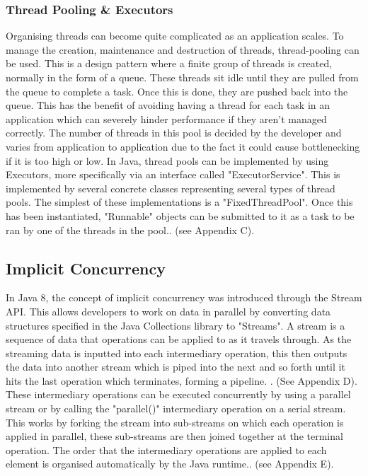 \documentclass[]{report}
\begin{document}
\subsubsection{Thread Pooling \& Executors}
Organising threads can become quite complicated as an application scales. To manage the creation, maintenance and destruction of threads, thread-pooling can be used. This is a design pattern where a finite group of threads is created, normally in the form of a queue. These threads sit idle until they are pulled from the queue to complete a task. Once this is done, they are pushed back into the queue. This has the benefit of avoiding having a thread for each task in an application which can severely hinder performance if they aren't managed correctly. The number of threads in this pool is decided by the developer and varies from application to application due to the fact it could cause bottlenecking if it is too high or low. In Java, thread pools can be implemented by using Executors, more specifically via an interface called "ExecutorService". This is implemented by several concrete classes representing several types of thread pools. The simplest of these implementations is a "FixedThreadPool". Once this has been instantiated, "Runnable" objects can be submitted to it as a task to be ran by one of the threads in the pool.\cite{Thread Pools}. (see Appendix C).

\subsection{Implicit Concurrency}
In Java 8, the concept of implicit concurrency was introduced through the Stream API. This allows developers to work on data in parallel by converting data structures specified in the Java Collections library to "Streams". A stream is a sequence of data that operations can be applied to as it travels through. As the streaming data is inputted into each intermediary operation, this then outputs the data into another stream which is piped into the next and so forth until it hits the last operation which terminates, forming a pipeline. \cite{Stream API}. (See Appendix D). These intermediary operations can be executed concurrently by using a parallel stream or by calling the "parallel()" intermediary operation on a serial stream. This works by forking the stream into sub-streams on which each operation is applied in parallel, these sub-streams are then joined together at the terminal operation. The order that the intermediary operations are applied to each element is organised automatically by the Java runtime.\cite{Stream API}. (see Appendix E).
\end{document}
